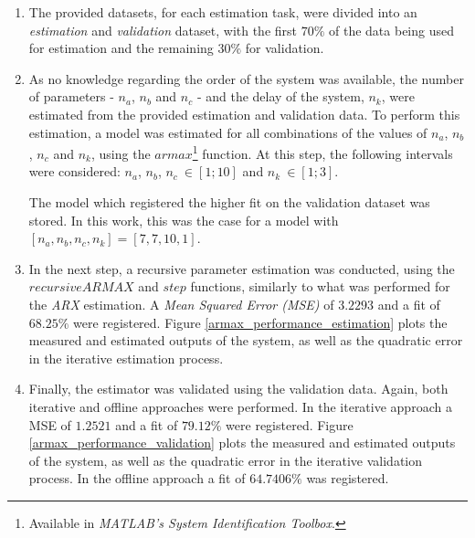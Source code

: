 \documentclass[12pt]{article}
\begin{document}
\begin{enumerate}
	\item The provided datasets, for each estimation task, were divided into an \emph{estimation} and \emph{validation} dataset, with the first $70\%$ of the data being used for estimation and the remaining $30\%$ for validation.
	
	\item As no knowledge regarding the order of the system was available, the number of parameters - $n_{a}$, $n_{b}$ and $n_{c}$ - and the delay of the system, $n_{k}$, were estimated from the provided estimation and validation data. To perform this estimation, a model was estimated for all combinations of the values of $n_{a}$, $n_{b}$, $n_{c}$ and $n_{k}$, using the $armax$\footnote{Available in \emph{MATLAB's System Identification Toolbox}.} function. At this step, the following intervals were considered: $n_{a}$, $n_{b}$, $n_{c} \: \in [1; 10]$ and $n_{k} \: \in [1; 3]$.
	
	The model which registered the higher fit on the validation dataset was stored. In this work, this was the case for a model with $[n_{a}, n_{b}, n_{c}, n_{k}] = [7, 7, 10, 1]$.
	
	\item In the next step, a recursive parameter estimation was conducted, using the $recursiveARMAX$ and $step$ functions\footnotemark[\value{footnote}], similarly to what was performed for the \emph{ARX} estimation. A \emph{Mean Squared Error (MSE)} of $3.2293$ and a fit of $68.25\%$ were registered. Figure \ref{armax_performance_estimation} plots the measured and estimated outputs of the system, as well as the quadratic error in the iterative estimation process.
	
	\item Finally, the estimator was validated using the validation data. Again, both iterative and offline approaches were performed. In the iterative approach a MSE of $1.2521$ and a fit of $79.12\%$ were registered. Figure \ref{armax_performance_validation} plots the measured and estimated outputs of the system, as well as the quadratic error in the iterative validation process. In the offline approach a fit of $64.7406\%$ was registered.
\end{enumerate}
\end{document}
